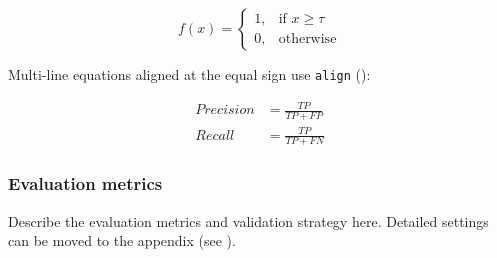 \begin{equation}
\label{eq:piecewise}
f(x) =
\begin{cases}
    1, & \text{if } x \geq \tau \\
    0, & \text{otherwise}
\end{cases}
\end{equation}

Multi-line equations aligned at the equal sign use \texttt{align} ():

\begin{align}
Precision &= \frac{TP}{TP+FP} \label{eq:precision} \\
Recall    &= \frac{TP}{TP+FN} \label{eq:recall}
\end{align}

\subsubsection{Evaluation metrics} \label{chap3:sec3:subsec2:subsubsec2}

Describe the evaluation metrics and validation strategy here. Detailed settings can be moved to the appendix (see ).
